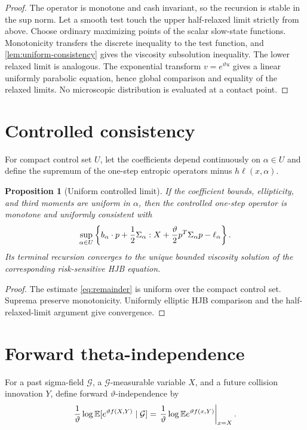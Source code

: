 \documentclass[11pt,reqno]{amsart}
\newtheorem{proposition}[theorem]{Proposition}
\theoremstyle{definition}
\newcommand{\E}{\mathbb E}
\begin{document}
\begin{proof}
The operator is monotone and cash invariant, so the recursion is stable in the
sup norm.  Let a smooth test touch the upper half-relaxed limit strictly from
above.  Choose ordinary maximizing points of the scalar slow-state functions.
Monotonicity transfers the discrete inequality to the test function, and
\cref{lem:uniform-consistency} gives the viscosity subsolution inequality.
The lower relaxed limit is analogous.  The exponential transform
$v=e^{\vartheta u}$ gives a linear uniformly parabolic equation, hence global
comparison and equality of the relaxed limits.  No microscopic distribution
is evaluated at a contact point.
\end{proof}

\section{Controlled consistency}

For compact control set $U$, let the coefficients depend continuously on
$\alpha\in U$ and define the supremum of the one-step entropic operators minus
$h\ell(x,\alpha)$.

\begin{proposition}[Uniform controlled limit]\label{prop:controlled}
If the coefficient bounds, ellipticity, and third moments are uniform in
$\alpha$, then the controlled one-step operator is monotone and uniformly
consistent with
\[
 \sup_{\alpha\in U}\left\{
 b_\alpha\cdot p+{1\over2}\Sigma_\alpha:X
 +{\vartheta\over2}p^T\Sigma_\alpha p-\ell_\alpha
 \right\}.
\]
Its terminal recursion converges to the unique bounded viscosity solution of
the corresponding risk-sensitive HJB equation.
\end{proposition}

\begin{proof}
The estimate \eqref{eq:remainder} is uniform over the compact control set.
Suprema preserve monotonicity.  Uniformly elliptic HJB comparison and the
half-relaxed-limit argument give convergence.
\end{proof}

\section{Forward theta-independence}

For a past sigma-field $\mathcal G$, a $\mathcal G$-measurable variable $X$,
and a future collision innovation $Y$, define forward
$\vartheta$-independence by
\[
 {1\over\vartheta}\log\E[e^{\vartheta f(X,Y)}\mid\mathcal G]
 =\left.{1\over\vartheta}\log\E e^{\vartheta f(x,Y)}\right|_{x=X}.
\]
\end{document}
